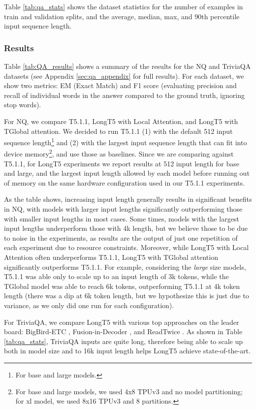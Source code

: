 Table \ref{tab:qa_stats} shows the dataset statistics for the number of examples in train and validation splits, and the average, median, max, and 90th percentile input sequence length.
\subsubsection{Results}

Table \ref{tab:QA_results} shows a summary of the results for the NQ and TriviaQA datasets (see Appendix \ref{sec:qa_appendix} for full results). For each dataset, we show two metrics: EM (Exact Match) and F1 score (evaluating precision and recall of individual words in the answer compared to the ground truth, ignoring stop words). 

For NQ, we compare T5.1.1, LongT5 with Local Attention, and LongT5 with TGlobal attention. We decided to run T5.1.1 (1) with the default 512 input sequence length\footnote{For base and large models.} and (2) with the largest input sequence length that can fit into device memory\footnote{For base and large models, we used 4x8 TPUv3 and no model partitioning; for xl model, we used 8x16 TPUv3 and 8 partitions.}, and use those as baselines. Since we are comparing against T5.1.1, for LongT5 experiments we report results at 512 input length for base and large, and the largest input length allowed by each model before running out of memory on the same hardware configuration used in our T5.1.1 experiments.

As the table shows, increasing input length generally results in significant benefits in NQ, with models with larger input lengths significantly outperforming those with smaller input lengths in most cases. Some times, models with the largest input lengths underperform those with 4k length, but we believe those to be due to noise in the experiments, as results are the output of just one repetition of each experiment due to resource constraints. Moreover, while LongT5 with Local Attention often underperforms T5.1.1, LongT5 with TGlobal attention significantly outperforms T5.1.1. For example, considering the {\em large} size models, T5.1.1 was able only to scale up to an input length of 3k tokens, while the TGlobal model was able to reach 6k tokens, outperforming T5.1.1 at 4k token length (there was a dip at 6k token length, but we hypothesize this is just due to variance, as we only did one run for each configuration).

For TriviaQA, we compare LongT5 with various top approaches on the leader board: BigBird-ETC \cite{bigbird}, Fusion-in-Decoder \cite{fid}, and ReadTwice \cite{readtwice}. As shown in Table \ref{tab:qa_stats}, TriviaQA inputs are quite long, therefore being able to scale up both in model size and to 16k input length helps LongT5 achieve state-of-the-art.

